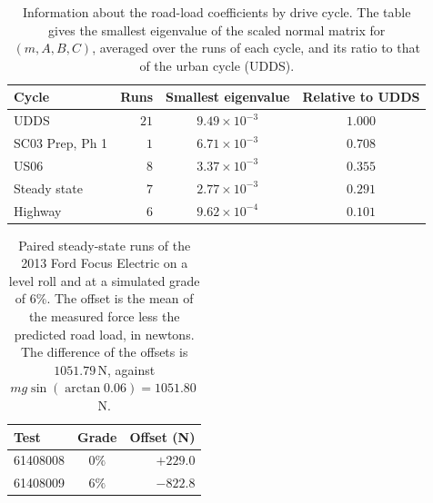 \documentclass[12pt, twoside]{amsart}
\theoremstyle{definition}
\begin{document}
\begin{table}[htbp]
\centering\small
\caption{Information about the road-load coefficients by drive cycle. The table gives the smallest eigenvalue of the scaled normal matrix for $(m,A,B,C)$, averaged over the runs of each cycle, and its ratio to that of the urban cycle (UDDS).}\label{tab:app-d3cycle}
\begin{tabular}{lrcc}
\toprule
Cycle & Runs & Smallest eigenvalue & Relative to UDDS\\
\midrule
UDDS & $21$ & $9.49\times10^{-3}$ & $1.000$\\
SC03 Prep, Ph 1 & $1$ & $6.71\times10^{-3}$ & $0.708$\\
US06 & $8$ & $3.37\times10^{-3}$ & $0.355$\\
Steady state & $7$ & $2.77\times10^{-3}$ & $0.291$\\
Highway & $6$ & $9.62\times10^{-4}$ & $0.101$\\
\bottomrule
\end{tabular}
\end{table}

\begin{table}[htbp]
\centering\small
\caption{Paired steady-state runs of the 2013 Ford Focus Electric on a level roll and at a simulated grade of $6\%$. The offset is the mean of the measured force less the predicted road load, in newtons. The difference of the offsets is $1051.79$\,N, against $mg\sin(\arctan0.06)=1051.80$\,N.}\label{tab:app-grade}
\begin{tabular}{lcr}
\toprule
Test & Grade & Offset (N)\\
\midrule
61408008 & $0\%$ & $+229.0$\\
61408009 & $6\%$ & $-822.8$\\
\bottomrule
\end{tabular}
\end{table}
\end{document}

